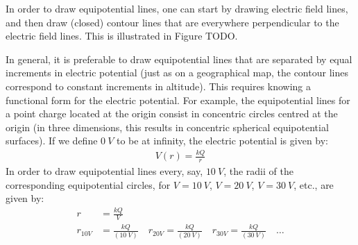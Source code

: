 In order to draw equipotential lines, one can start by drawing electric field lines, and then draw (closed) contour lines that are everywhere perpendicular to the electric field lines. This is illustrated in Figure TODO. 


In general, it is preferable to draw equipotential lines that are separated by equal increments in electric potential (just as on a geographical map, the contour lines correspond to constant increments in altitude). This requires knowing a functional form for the electric potential. For example, the equipotential lines for a point charge located at the origin consist in concentric circles centred at the origin (in three dimensions, this results in concentric spherical equipotential surfaces). If we define $\SI{0}{V}$ to be at infinity, the electric potential is given by:
\begin{align*}
V(r)=\frac{kQ}{r}
\end{align*}
In order to draw equipotential lines every, say, $\SI{10}{V}$, the radii of the corresponding equipotential circles, for $V=\SI{10}{V}$, $V=\SI{20}{V}$, $V=\SI{30}{V}$, etc., are given by:
\begin{align*}
r&=\frac{kQ}{V}\\
r_{10V}&=\frac{kQ}{(\SI{10}{V})}\quad r_{20V}=\frac{kQ}{(\SI{20}{V})}\quad r_{30V}=\frac{kQ}{(\SI{30}{V})}\quad \dots
\end{align*}

